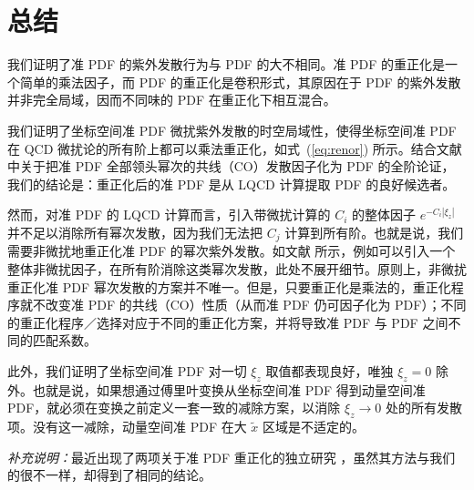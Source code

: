 \section{总结}
\label{sec:summary}

我们证明了准 PDF 的紫外发散行为与 PDF 的大不相同。准 PDF 的重正化是一个简单的乘法因子，而 PDF 的重正化是卷积形式，其原因在于 PDF 的紫外发散并非完全局域，因而不同味的 PDF 在重正化下相互混合。

我们证明了坐标空间准 PDF 微扰紫外发散的时空局域性，使得坐标空间准 PDF 在 QCD 微扰论的所有阶上都可以乘法重正化，如式~(\ref{eq:renor}) 所示。结合文献 \cite{Ma:2014jla} 中关于把准 PDF 全部领头幂次的共线（CO）发散因子化为 PDF 的全阶论证，我们的结论是：重正化后的准 PDF 是从 LQCD 计算提取 PDF 的良好候选者。

然而，对准 PDF 的 LQCD 计算而言，引入带微扰计算的 $C_i$ 的整体因子 $e^{-C_i |\xi_z|}$ 并不足以消除所有幂次发散，因为我们无法把 $C_j$ 计算到所有阶。也就是说，我们需要非微扰地重正化准 PDF 的幂次紫外发散。如文献 \cite{Ishikawa:2016znu} 所示，例如可以引入一个整体非微扰因子，在所有阶消除这类幂次发散，此处不展开细节。原则上，非微扰重正化准 PDF 幂次发散的方案并不唯一。但是，只要重正化是乘法的，重正化程序就不改变准 PDF 的共线（CO）性质（从而准 PDF 仍可因子化为 PDF）；不同的重正化程序／选择对应于不同的重正化方案，并将导致准 PDF 与 PDF 之间不同的匹配系数。

此外，我们证明了坐标空间准 PDF 对一切 $\xi_z$ 取值都表现良好，唯独 $\xi_z=0$ 除外。也就是说，如果想通过傅里叶变换从坐标空间准 PDF 得到动量空间准 PDF，就必须在变换之前定义一套一致的减除方案，以消除 $\xi_z\to 0$ 处的所有发散项。没有这一减除，动量空间准 PDF 在大 $\tilde{x}$ 区域是不适定的。

{\it 补充说明：}最近出现了两项关于准 PDF 重正化的独立研究 \cite{Ji:2017oey,Green:2017xeu}，虽然其方法与我们的很不一样，却得到了相同的结论。
